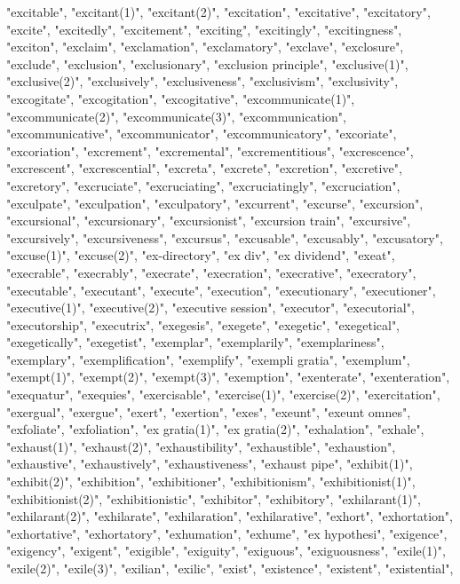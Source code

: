 "excitable",
"excitant(1)",
"excitant(2)",
"excitation",
"excitative",
"excitatory",
"excite",
"excitedly",
"excitement",
"exciting",
"excitingly",
"excitingness",
"exciton",
"exclaim",
"exclamation",
"exclamatory",
"exclave",
"exclosure",
"exclude",
"exclusion",
"exclusionary",
"exclusion principle",
"exclusive(1)",
"exclusive(2)",
"exclusively",
"exclusiveness",
"exclusivism",
"exclusivity",
"excogitate",
"excogitation",
"excogitative",
"excommunicate(1)",
"excommunicate(2)",
"excommunicate(3)",
"excommunication",
"excommunicative",
"excommunicator",
"excommunicatory",
"excoriate",
"excoriation",
"excrement",
"excremental",
"excrementitious",
"excrescence",
"excrescent",
"excrescential",
"excreta",
"excrete",
"excretion",
"excretive",
"excretory",
"excruciate",
"excruciating",
"excruciatingly",
"excruciation",
"exculpate",
"exculpation",
"exculpatory",
"excurrent",
"excurse",
"excursion",
"excursional",
"excursionary",
"excursionist",
"excursion train",
"excursive",
"excursively",
"excursiveness",
"excursus",
"excusable",
"excusably",
"excusatory",
"excuse(1)",
"excuse(2)",
"ex-directory",
"ex div",
"ex dividend",
"exeat",
"execrable",
"execrably",
"execrate",
"execration",
"execrative",
"execratory",
"executable",
"executant",
"execute",
"execution",
"executionary",
"executioner",
"executive(1)",
"executive(2)",
"executive session",
"executor",
"executorial",
"executorship",
"executrix",
"exegesis",
"exegete",
"exegetic",
"exegetical",
"exegetically",
"exegetist",
"exemplar",
"exemplarily",
"exemplariness",
"exemplary",
"exemplification",
"exemplify",
"exempli gratia",
"exemplum",
"exempt(1)",
"exempt(2)",
"exempt(3)",
"exemption",
"exenterate",
"exenteration",
"exequatur",
"exequies",
"exercisable",
"exercise(1)",
"exercise(2)",
"exercitation",
"exergual",
"exergue",
"exert",
"exertion",
"exes",
"exeunt",
"exeunt omnes",
"exfoliate",
"exfoliation",
"ex gratia(1)",
"ex gratia(2)",
"exhalation",
"exhale",
"exhaust(1)",
"exhaust(2)",
"exhaustibility",
"exhaustible",
"exhaustion",
"exhaustive",
"exhaustively",
"exhaustiveness",
"exhaust pipe",
"exhibit(1)",
"exhibit(2)",
"exhibition",
"exhibitioner",
"exhibitionism",
"exhibitionist(1)",
"exhibitionist(2)",
"exhibitionistic",
"exhibitor",
"exhibitory",
"exhilarant(1)",
"exhilarant(2)",
"exhilarate",
"exhilaration",
"exhilarative",
"exhort",
"exhortation",
"exhortative",
"exhortatory",
"exhumation",
"exhume",
"ex hypothesi",
"exigence",
"exigency",
"exigent",
"exigible",
"exiguity",
"exiguous",
"exiguousness",
"exile(1)",
"exile(2)",
"exile(3)",
"exilian",
"exilic",
"exist",
"existence",
"existent",
"existential",
